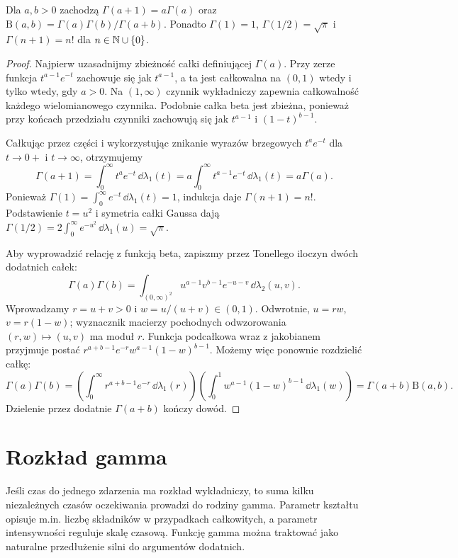 \begin{lemat}
Dla $a,b>0$ zachodzą
$\Gamma(a+1)=a\Gamma(a)$ oraz
$\mathrm B(a,b)=\Gamma(a)\Gamma(b)/\Gamma(a+b)$.
Ponadto $\Gamma(1)=1$, $\Gamma(1/2)=\sqrt\pi$
i $\Gamma(n+1)=n!$ dla $n\in\mathbb{N}\cup\{0\}$.
\end{lemat}
\begin{proof}
Najpierw uzasadnijmy zbieżność całki definiującej
$\Gamma(a)$. Przy zerze funkcja $t^{a-1}e^{-t}$
zachowuje się jak $t^{a-1}$, a ta jest całkowalna
na $(0,1)$ wtedy i tylko wtedy, gdy $a>0$.
Na $(1,\infty)$ czynnik wykładniczy zapewnia
całkowalność każdego wielomianowego czynnika.
Podobnie całka beta jest zbieżna, ponieważ
przy końcach przedziału czynniki zachowują się
jak $t^{a-1}$ i $(1-t)^{b-1}$.

Całkując przez części i wykorzystując znikanie
wyrazów brzegowych $t^a e^{-t}$ dla $t\to0+$
i $t\to\infty$, otrzymujemy
\[
\Gamma(a+1)=\int_0^\infty t^ae^{-t}\,\dd\lambda_1(t)
=a\int_0^\infty t^{a-1}e^{-t}\,\dd\lambda_1(t)
=a\Gamma(a).
\]
Ponieważ $\Gamma(1)=\int_0^\infty e^{-t}\,\dd\lambda_1(t)=1$,
indukcja daje $\Gamma(n+1)=n!$.
Podstawienie $t=u^2$ i symetria całki Gaussa dają
$\Gamma(1/2)=2\int_0^\infty e^{-u^2}\,\dd\lambda_1(u)
=\sqrt\pi$.

Aby wyprowadzić relację z funkcją beta, zapiszmy
przez Tonellego iloczyn dwóch dodatnich całek:
\[
\Gamma(a)\Gamma(b)
=\int_{(0,\infty)^2}u^{a-1}v^{b-1}e^{-u-v}
\,\dd\lambda_2(u,v).
\]
Wprowadzamy $r=u+v>0$ i $w=u/(u+v)\in(0,1)$.
Odwrotnie, $u=rw$, $v=r(1-w)$; wyznacznik macierzy
pochodnych odwzorowania $(r,w)\mapsto(u,v)$
ma moduł $r$. Funkcja podcałkowa wraz z jakobianem
przyjmuje postać
$r^{a+b-1}e^{-r}w^{a-1}(1-w)^{b-1}$.
Możemy więc ponownie rozdzielić całkę:
\[
\Gamma(a)\Gamma(b)
=\left(\int_0^\infty r^{a+b-1}e^{-r}\,\dd\lambda_1(r)\right)
\left(\int_0^1w^{a-1}(1-w)^{b-1}\,\dd\lambda_1(w)\right)
=\Gamma(a+b)\mathrm B(a,b).
\]
Dzielenie przez dodatnie $\Gamma(a+b)$ kończy dowód.
\end{proof}

\section{Rozkład gamma}
Jeśli czas do jednego zdarzenia ma rozkład wykładniczy, to
suma kilku niezależnych czasów oczekiwania prowadzi do rodziny
gamma. Parametr kształtu opisuje m.in. liczbę składników
w przypadkach całkowitych, a parametr intensywności reguluje
skalę czasową. Funkcję gamma można traktować jako naturalne
przedłużenie silni do argumentów dodatnich.

